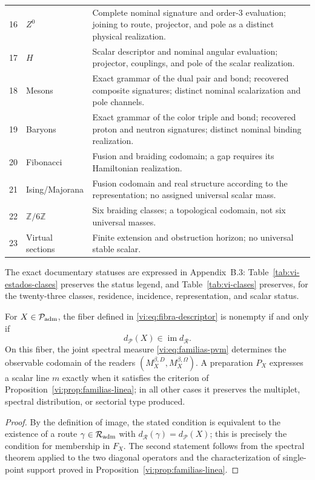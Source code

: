 \begin{table}[!htbp]
\begin{tabular}{@{}p{.11\linewidth}p{.20\linewidth}p{.62\linewidth}@{}}
 16&\(Z^0\)&Complete nominal signature and order-\(3\) evaluation; joining to route, projector, and pole as a distinct physical realization.\\
 17&\(H\)&Scalar descriptor and nominal angular evaluation; projector, couplings, and pole of the scalar realization.\\
 18&Mesons&Exact grammar of the dual pair and bond; recovered composite signatures; distinct nominal scalarization and pole channels.\\
 19&Baryons&Exact grammar of the color triple and bond; recovered proton and neutron signatures; distinct nominal binding realization.\\
 20&Fibonacci&Fusion and braiding codomain; a gap requires its Hamiltonian realization.\\
 21&Ising/Majorana&Fusion codomain and real structure according to the representation; no assigned universal scalar mass.\\
 22&\(\mathbb Z/6\mathbb Z\)&Six braiding classes; a topological codomain, not six universal masses.\\
 23&Virtual sections&Finite extension and obstruction horizon; no universal stable scalar.\\
\end{tabular}
\end{table}

The exact documentary statuses are expressed in Appendix~B.3:
Table~\ref{tab:vi-estados-clases} preserves the status legend, and
Table~\ref{tab:vi-clases} preserves, for the twenty-three classes, residence,
incidence, representation, and scalar status.

\begin{proposition}
\label{vi:prop:producto-fibrado-especie-ruta}
For \(X\in\mathcal P_{\rm adm}\), the fiber defined in
\eqref{vi:eq:fibra-descriptor} is nonempty if and only if
\[
 d_{\mathcal P}(X)\in\operatorname{im}d_{\mathcal R}.
\]
On this fiber, the joint spectral measure
\eqref{vi:eq:familias-pvm} determines the observable codomain of the readers
\((M_X^{\beta,D},M_X^{\beta,\Omega})\). A preparation \(P_X\) expresses a
scalar line \(m\) exactly when it satisfies the criterion of
Proposition~\ref{vi:prop:familias-linea}; in all other cases it preserves the
multiplet, spectral distribution, or sectorial type produced.
\end{proposition}
\begin{proof}
By the definition of image, the stated condition is equivalent to the existence of
a route \(\gamma\in\mathcal R_{\rm adm}\) with
\(d_{\mathcal R}(\gamma)=d_{\mathcal P}(X)\); this is precisely the
condition for membership in \(F_X\). The second statement follows from the spectral
theorem applied to the two diagonal operators and the characterization
of single-point support proved in
Proposition~\ref{vi:prop:familias-linea}.
\end{proof}

